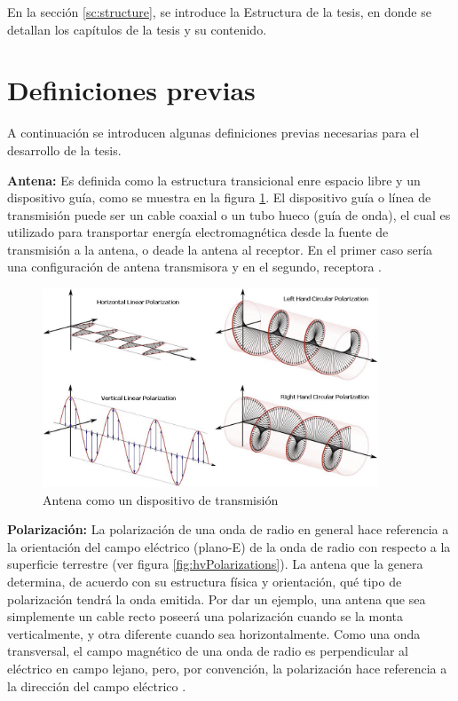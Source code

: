 En la sección \ref{sc:structure}, se introduce la Estructura de la tesis, en donde se detallan los capítulos de la tesis y su
contenido.


\section{Definiciones previas} \label{sc:definitions}

A continuación se introducen algunas definiciones previas necesarias para el desarrollo de la tesis.


{\textbf{Antena:}} Es definida como la estructura transicional enre espacio libre y un dispositivo guía, como se muestra en la 
figura \ref{fig:antenna}. El dispositivo guía o línea de transmisión puede ser un cable coaxial o un tubo hueco (guía de 
onda), el cual es utilizado para transportar energía electromagnética desde la fuente de transmisión a la antena, o deade la 
antena al receptor. En el primer caso sería una configuración de antena transmisora y en el segundo, receptora \cite{Balanis2012}.
\begin{figure}[H]
 \centering
 \includegraphics[width=10cm]{gfx/polarizations.png}
 \caption{Antena como un dispositivo de transmisión \cite{Balanis2012}}
 \label{fig:antenna}
\end{figure}

{\textbf{Polarización:}} La polarización de una onda de radio en general hace referencia a la orientación del campo
eléctrico (plano-E) de la onda de radio con respecto a la superficie terrestre (ver figura \ref{fig:hvPolarizations}). La antena
que la genera determina, de acuerdo con su estructura física y orientación, qué tipo de polarización tendrá la onda emitida.
Por dar un ejemplo, una antena que sea simplemente un cable recto poseerá una polarización cuando se la monta verticalmente, y
otra diferente cuando sea horizontalmente. Como una onda transversal, el campo magnético de una onda de radio es perpendicular
al eléctrico en campo lejano, pero, por convención, la polarización hace referencia a la dirección del campo eléctrico
\cite{AntennaWiki}.

